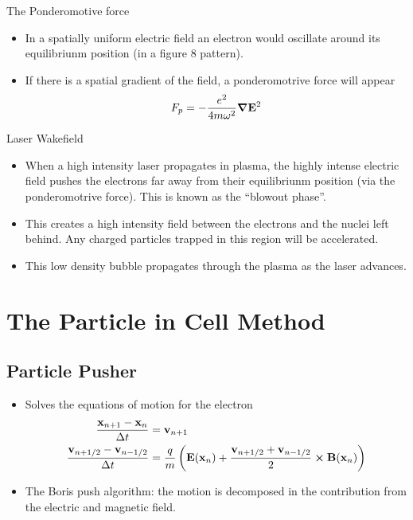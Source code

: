 \documentclass{beamer}
\begin{document}
\begin{frame}{The Ponderomotive force}
  \begin{itemize}
	\item In a spatially uniform electric field an electron would oscillate around
  	its equilibriunm position (in a figure 8 pattern).
  	\item If there is a spatial gradient of the field, a ponderomotrive force will
  	appear
  	\[
  	F_p = -\frac{e^2}{4m \omega^2} \grad{\vb{E}}^2
  	\]
	\end{itemize}
\end{frame}


\begin{frame}{Laser Wakefield}
  \begin{itemize}
    \item When a high intensity laser propagates in plasma, the highly intense
	electric field pushes the electrons far away from their equilibriunm
	position (via the ponderomotrive force). This is known as the ``blowout phase''.
	\item This creates a high intensity field between the electrons and the
	nuclei left behind. Any charged particles trapped in this region will be accelerated.
	\item This low density bubble propagates through the plasma as the laser advances.
	\end{itemize}
\end{frame}

\section{The Particle in Cell Method}

\subsection{Particle Pusher}

\begin{frame}
	\begin{itemize}
		\item Solves the equations of motion for the electron
		\begin{subequations}
		  \begin{align*}
		    \frac{\vb{x}_{n+1}-\vb{x}_n}{\Delta t} &= \vb{v}_{n+1} \\
		    \frac{\vb{v}_{n+1/2}-\vb{v}_{n-1/2}}{\Delta t} &= \frac{q}{m}
		      \left(\vb{E}(\vb{x}_n) + \frac{\vb{v}_{n+1/2}+\vb{v}_{n-1/2}}{2} \cp \vb{B}(\vb{x}_n)\right)
		  \end{align*}
		\end{subequations}
		\item The Boris push algorithm: the motion is decomposed in the contribution from the electric
		and magnetic field.
	\end{itemize}
\end{frame}
\end{document}
